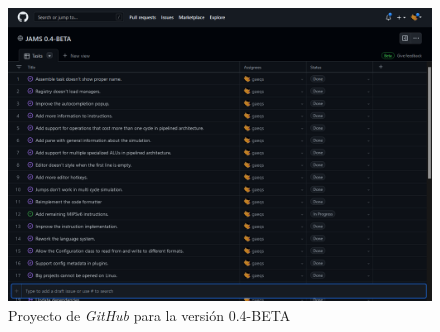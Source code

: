 \begin{figure}[H]
    \centering
    \includegraphics[width=\textwidth]{images/introduction/github}
    \caption{Proyecto de \textit{GitHub} para la versión 0.4-BETA}
    \label{fig:introduccion-github}
\end{figure}
